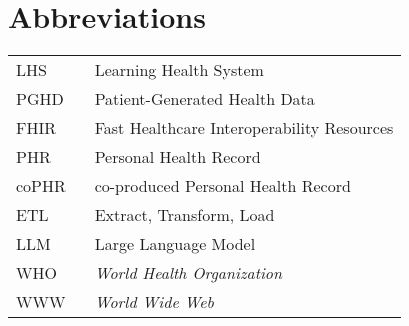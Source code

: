 \chapter*{Abbreviations}


\begin{flushleft}
\begin{tabular}{l p{0.8\linewidth}}
    LHS      & Learning Health System\\
    PGHD     & Patient-Generated Health Data\\
    FHIR     & Fast Healthcare Interoperability Resources\\
    PHR      & Personal Health Record\\
    coPHR    & co-produced Personal Health Record\\
    ETL      & Extract, Transform, Load\\
    LLM      & Large Language Model\\
    WHO      & \emph{World Health Organization}\\
    WWW      & \emph{World Wide Web}
\end{tabular}
\end{flushleft}

